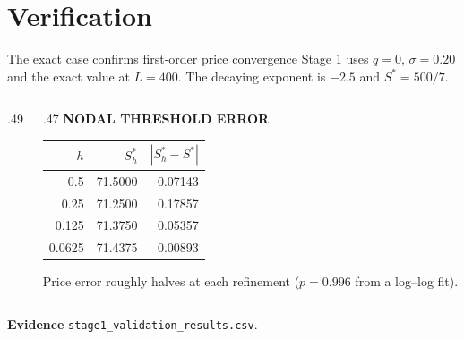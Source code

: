 \documentclass[aspectratio=169,11pt]{beamer}
\newcommand{\labeltext}[1]{{\footnotesize\bfseries\color{Teal}#1}}
\newcommand{\sourcefile}[1]{\par\vfill{\scriptsize\color{Muted}#1\par}}
\begin{document}
\section{Verification}

\begin{frame}[t]{The exact case confirms first-order price convergence}
  Stage 1 uses $q=0$, $\sigma=0.20$ and the exact value at $L=400$.
  The decaying exponent is $-2.5$ and $S^*=500/7$.
  \medskip
  \begin{columns}[T,onlytextwidth]
    \begin{column}{.49\textwidth}
    \end{column}
    \begin{column}{.47\textwidth}
      \labeltext{NODAL THRESHOLD ERROR}\par\smallskip
      {\small
      \renewcommand{\arraystretch}{1.13}
      \begin{tabular}{@{}rrr@{}}
        \toprule
        $h$ & $S_h^*$ & $|S_h^*-S^*|$ \\
        \midrule
        0.5    & 71.5000 & 0.07143 \\
        0.25   & 71.2500 & 0.17857 \\
        0.125  & 71.3750 & 0.05357 \\
        0.0625 & 71.4375 & 0.00893 \\
        \bottomrule
      \end{tabular}\par}
      \smallskip
      \small Price error roughly halves at each refinement
      ($p=0.996$ from a log--log fit).
    \end{column}
  \end{columns}
  \sourcefile{\textbf{Evidence} \enspace \texttt{stage1\_validation\_results.csv}.}
\end{frame}
\end{document}
